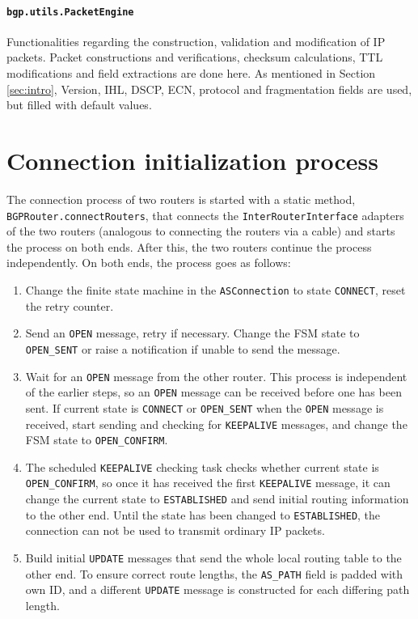 \documentclass[11pt,a4paper,titlepage]{report}
\begin{document}
\paragraph{\texttt{bgp.utils.PacketEngine}}
Functionalities regarding the construction, validation and modification of IP packets. Packet constructions and verifications, checksum calculations, TTL modifications and field extractions are done here. As mentioned in Section \ref{sec:intro}, Version, IHL, DSCP, ECN, protocol and fragmentation fields are used, but filled with default values.


\section{Connection initialization process}\label{sec:init}
The connection process of two routers is started with a static method, \texttt{BGPRouter.connectRouters}, that connects the \texttt{InterRouterInterface} adapters of the two routers (analogous to connecting the routers via a cable) and starts the process on both ends. After this, the two routers continue the process independently. On both ends, the process goes as follows:
\begin{enumerate}
\item Change the finite state machine in the \texttt{ASConnection} to state \texttt{CONNECT}, reset the retry counter.
\item Send an \texttt{OPEN} message, retry if necessary. Change the FSM state to \texttt{OPEN\_SENT} or raise a notification if unable to send the message.
\item Wait for an \texttt{OPEN} message from the other router. This process is independent of the earlier steps, so an \texttt{OPEN} message can be received before one has been sent. If current state is \texttt{CONNECT} or \texttt{OPEN\_SENT} when the \texttt{OPEN} message is received, start sending and checking for \texttt{KEEPALIVE} messages, and change the FSM state to \texttt{OPEN\_CONFIRM}.
\item The scheduled \texttt{KEEPALIVE} checking task checks whether current state is \texttt{OPEN\_CONFIRM}, so once it has received the first \texttt{KEEPALIVE} message, it can change the current state to \texttt{ESTABLISHED} and send initial routing information to the other end. Until the state has been changed to \texttt{ESTABLISHED}, the connection can not be used to transmit ordinary IP packets.
\item Build initial \texttt{UPDATE} messages that send the whole local routing table to the other end. To ensure correct route lengths, the \texttt{AS\_PATH} field is padded with own ID, and a different \texttt{UPDATE} message is constructed for each differing path length.
\end{enumerate}
\end{document}
